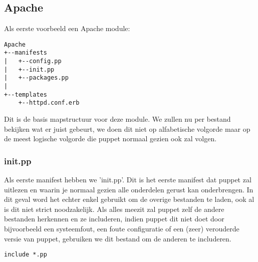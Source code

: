 \subsection{Apache}
Als eerste voorbeeld een Apache module:
%
\begin{code}
\begin{lstlisting}
Apache
+--manifests
|	+--config.pp
|	+--init.pp
|	+--packages.pp
|
+--templates
	+--httpd.conf.erb
\end{lstlisting}
\end{code}
%
Dit is de basis mapstructuur voor deze module. We zullen nu per bestand bekijken wat er juist gebeurt, we doen dit niet op alfabetische volgorde maar op de meest logische volgorde die puppet normaal gezien ook zal volgen.
%
\subsubsection{init.pp}
Als eerste manifest hebben we 'init.pp'. Dit is het eerste manifest dat puppet zal uitlezen en waarin je normaal gezien alle onderdelen gerust kan onderbrengen. In dit geval word het echter enkel gebruikt om de overige bestanden te laden, ook al is dit niet strict noodzakelijk. Als alles meezit zal puppet zelf de andere bestanden herkennen en ze includeren, indien puppet dit niet doet door bijvoorbeeld een systeemfout, een foute configuratie of een (zeer) verouderde versie van puppet, gebruiken we dit bestand om de anderen te includeren.
\begin{code}
\begin{lstlisting}
include *.pp
\end{lstlisting}
\end{code}
%
